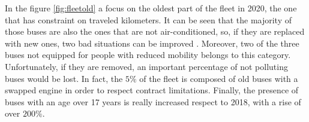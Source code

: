\newpage
\begin{landscape}
\thispagestyle{empty}

\end{landscape}
\newpage

In the figure \ref{fig:fleetold}  a focus on the oldest part of the fleet in 2020, the one that has constraint on traveled kilometers. 
It can be seen that the majority of those buses are also the ones that are not air-conditioned, so, if they are replaced with new ones, two bad situations can be improved . Moreover, two of the three buses not equipped for people with reduced mobility belongs to this category. Unfortunately, if they are removed, an important percentage of not polluting buses would be lost. In fact, the $5\%$ of the fleet is composed of old buses with a swapped engine in order to respect contract limitations. Finally, the presence of buses with an age over 17 years is really increased respect to 2018, with a rise of over $200\%$.

\newpage
\begin{landscape}
\thispagestyle{empty}

\end{landscape}
\newpage

